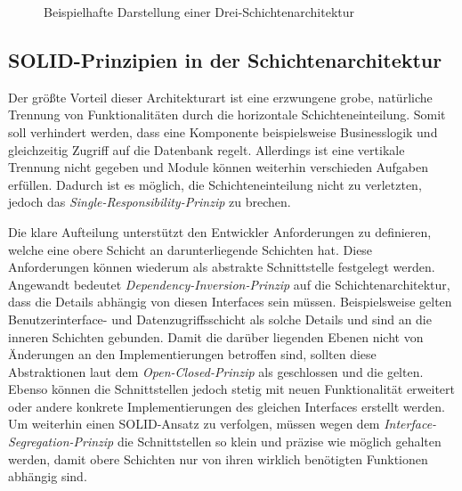 \documentclass[conference]{IEEEtran}
\begin{document}
\begin{figure}[htbp]
	\small
	
	\caption{Beispielhafte Darstellung einer Drei-Schichtenarchitektur}
	\label{Schichtenarchitektur}
\end{figure}


\subsection{SOLID-Prinzipien in der Schichtenarchitektur}

Der größte Vorteil dieser Architekturart ist eine erzwungene grobe, natürliche Trennung von Funktionalitäten durch die horizontale Schichteneinteilung. Somit soll verhindert werden, dass eine Komponente beispielsweise Businesslogik und gleichzeitig Zugriff auf die Datenbank regelt. Allerdings ist eine vertikale Trennung nicht gegeben und Module können weiterhin verschieden Aufgaben erfüllen. Dadurch ist es möglich, die Schichteneinteilung nicht zu verletzten, jedoch das \emph{Single-Responsibility-Prinzip} zu brechen.


Die klare Aufteilung unterstützt den Entwickler Anforderungen zu definieren, welche eine obere Schicht an darunterliegende Schichten hat. Diese Anforderungen können wiederum als abstrakte Schnittstelle festgelegt werden. Angewandt bedeutet \emph{Dependency-Inversion-Prinzip} auf die Schichtenarchitektur, dass die Details abhängig von diesen Interfaces sein müssen. Beispielsweise gelten Benutzerinterface- und Datenzugriffsschicht als solche Details und sind an die inneren Schichten gebunden. Damit die darüber liegenden Ebenen nicht von Änderungen an den Implementierungen betroffen sind, sollten diese Abstraktionen laut dem \emph{Open-Closed-Prinzip} als geschlossen und die gelten. Ebenso können die Schnittstellen jedoch stetig mit neuen Funktionalität erweitert oder andere konkrete Implementierungen des gleichen Interfaces erstellt werden. Um weiterhin einen SOLID-Ansatz zu verfolgen, müssen wegen dem \emph{Interface-Segregation-Prinzip} die Schnittstellen so klein und präzise wie möglich gehalten werden, damit obere Schichten nur von ihren wirklich benötigten Funktionen abhängig sind.


\end{document}

